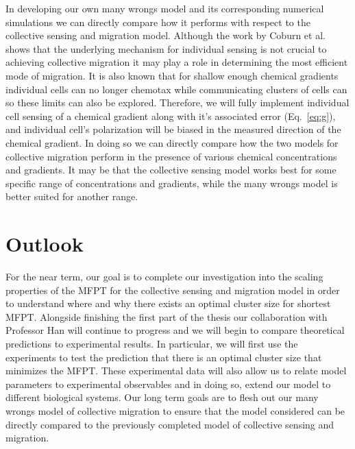\documentclass[phys,prelim]{puthesis}
\begin{document}
In developing our own many wrongs model and its corresponding numerical simulations we can directly compare how it performs with respect to the collective sensing and migration model. Although the work by Coburn et al. shows that the underlying mechanism for individual sensing is not crucial to achieving collective migration it may play a role in determining the most efficient mode of migration. It is also known that for shallow enough chemical gradients individual cells can no longer chemotax while communicating clusters of cells can \cite{ellison2015cell} so these limits can also be explored. Therefore, we will fully implement individual cell sensing of a chemical gradient along with it's associated error (Eq.\ \ref{eq:g}), and individual cell's polarization will be biased in the measured direction of the chemical gradient. In doing so we can directly compare how the two models for collective migration perform in the presence of various chemical concentrations and gradients. It may be that the collective sensing model works best for some specific range of concentrations and gradients, while the many wrongs model is better suited for another range.


\chapter{Outlook}

For the near term, our goal is to complete our investigation into the scaling properties of the MFPT for the collective sensing and migration model in order to understand where and why there exists an optimal cluster size for shortest MFPT. Alongside finishing the first part of the thesis our collaboration with Professor Han will continue to progress and we will begin to compare theoretical predictions to experimental results. In particular, we will first use the experiments to test the prediction that there is an optimal cluster size that minimizes the MFPT. These experimental data will also allow us to relate model parameters to experimental observables and in doing so, extend our model to different biological systems. Our long term goals are to flesh out our many wrongs model of collective migration to ensure that the model considered can be directly compared to the previously completed model of collective sensing and migration.


% 

\end{document}
